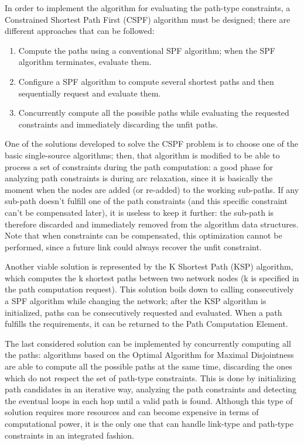 \documentclass[10pt,a4paper]{report}
\begin{document}
In order to implement the algorithm for evaluating the path-type
constraints, a Constrained Shortest Path First (CSPF) algorithm must
be designed; there are different approaches that can be followed:
\begin{enumerate}
\item Compute the paths using a conventional SPF algorithm; when the
  SPF algorithm terminates, evaluate them.
\item Configure a SPF algorithm to compute several shortest paths and then
  sequentially request and evaluate them.
\item Concurrently compute all the possible paths while evaluating the
  requested constraints and immediately discarding the unfit paths.
\end{enumerate}

One of the solutions developed to solve the CSPF problem is to choose
one of the basic single-source algorithms; then, that algorithm is
modified to be able to process a set of constraints during the path
computation: a good phase for analyzing path constraints is during
arc relaxation, since it is basically the moment when the nodes are
added (or re-added) to the working sub-paths. If any sub-path doesn't
fulfill one of the path constraints (and this specific constraint
can't be compensated later), it is useless to keep it further: the
sub-path is therefore discarded and immediately removed from the
algorithm data structures. Note that when constraints can be
compensated, this optimization cannot be performed, since a future
link could always recover the unfit constraint.

Another viable solution is represented by the K Shortest Path (KSP)
algorithm, which computes the k shortest paths between two network
nodes (k is specified in the path computation request). This solution
boils down to calling consecutively a SPF algorithm while changing the
network; after the KSP algorithm is initialized, paths can be
consecutively requested and evaluated. When a path fulfills the
requirements, it can be returned to the Path Computation Element.

The last considered solution can be implemented by concurrently
computing all the paths: algorithms based on the Optimal Algorithm for
Maximal Disjointness are able to compute all the possible paths at the
same time, discarding the ones which do not respect the set of
path-type constraints. This is done by initializing path candidates in
an iterative way, analyzing the path constraints and detecting the
eventual loops in each hop until a valid path is found. Although this
type of solution requires more resources and can become expensive in
terms of computational power, it is the only one that can handle
link-type and path-type constraints in an integrated fashion.
\end{document}
